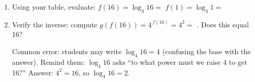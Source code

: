 \documentclass[10pt]{article}
\begin{document}
\begin{tcolorbox}[colback=white, colframe=black!40,
    title=\textbf{Tier R --- Remediate},
    fonttitle=\bfseries, arc=2mm, left=3mm, right=3mm, top=2mm, bottom=2mm]
\begin{enumerate}[leftmargin=1.8em, itemsep=10pt]
\item Using your table, evaluate: \quad $f(16) = \log_4 16 = $  \qquad $f(1) = \log_4 1 = $ 

\vspace{6pt}

\item Verify the inverse: compute $g(f(16)) = 4^{\,f(16)} = 4^2 = $ . Does this equal 16? 

\begin{teachernote}
Common error: students may write $\log_4 16 = 4$ (confusing the base with the answer).
Remind them: $\log_4 16$ asks ``to what power must we raise 4 to get 16?'' Answer: $4^2 = 16$,
so $\log_4 16 = 2$.
\end{teachernote}

\end{enumerate}
\end{tcolorbox}

\vspace{0.1in}
\end{document}

